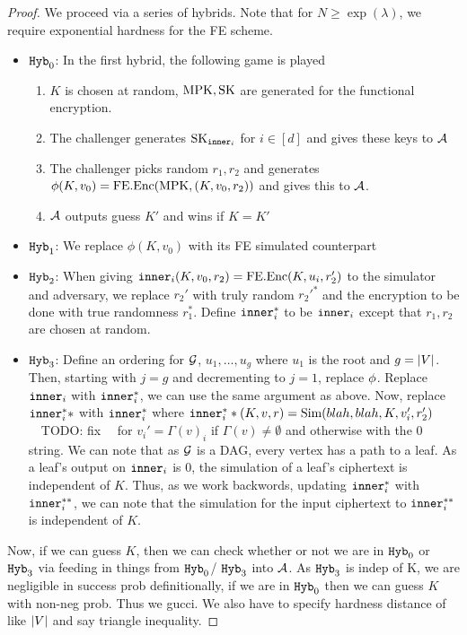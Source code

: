 \begin{lemma}
\begin{proof}
		We proceed via a series of hybrids. Note that for $N \geq \exp(\lambda)$, we require exponential hardness for the FE scheme.
		\begin{itemize}
			\item $\texttt{Hyb}_0$: In the first hybrid, the following game is played
				\begin{enumerate}
					\item $K$ is chosen at random, $\text{MPK}, \text{SK}$ are generated for the functional encryption.
					\item The challenger generates $\text{SK}_{\texttt{inner}_i}$ for $i \in [d]$ and gives these keys to $\mathcal{A}$
					\item The challenger picks random $r_1, r_2$ and generates $\phi(K, v_0) = \text{FE.Enc}(\text{MPK}, (K, v_0, r_2))$ and gives this to $\mathcal{A}$.
					\item $\mathcal{A}$ outputs guess $K'$ and wins if $K = K'$
				\end{enumerate}
			\item $\texttt{Hyb}_1$: We replace $\phi(K, v_0)$ with its FE simulated counterpart
			\item $\texttt{Hyb}_2$: When giving $\texttt{inner}_i(K, v_0, r_2) = \text{FE.Enc}(K, u_i, r_2')$ to the simulator and adversary,
			we replace $r_2'$ with truly random $r_2'^*$ and the encryption to be done with true randomness $r_1^*$.
			Define $\texttt{inner}_i^*$ to be $\texttt{inner}_i$ except that $r_1, r_2$ are chosen at random.
			\item $\texttt{Hyb}_3$: Define an ordering for $\mathcal{G}$, $u_1, \dots, u_g$ where $u_1$ is the root and $g = |V|$.
			Then, starting with $j = g$ and decrementing to $j = 1$, replace $\phi$.
			Replace $\texttt{inner}_i$ with $\texttt{inner}_i^*$, we can use the same argument as above.
			Now, replace $\texttt{inner}_i^**$ with $\texttt{inner}_i^*$ where $\texttt{inner}_i^**(K, v, r) = \text{Sim}(blah, blah, K, v_i', r_2')$ ~~TODO: fix~~ for $v_i' = \Gamma(v)_i$
			if $\Gamma(v) \neq \emptyset$ and otherwise with the $0$ string.
			We can note that as $\mathcal{G}$ is a DAG, every vertex has a path to a leaf.
			As a leaf's output on $\texttt{inner}_i$ is 0, the simulation of a leaf's ciphertext is independent of $K$.
			Thus, as we work backwords, updating $\texttt{inner}_i^*$ with $\texttt{inner}_i^{**}$, we can note that the simulation for the input ciphertext to $\texttt{inner}_i^{**}$ is independent of $K$.	
		\end{itemize}
		Now, if we can guess $K$, then we can check whether or not we are in $\texttt{Hyb}_0$ or $\texttt{Hyb}_3$ 
		via feeding in things from $\texttt{Hyb}_0$/ $\texttt{Hyb}_3$ into $\mathcal{A}$. As $\texttt{Hyb}_3$ is indep of K, we are negligible in success prob definitionally,
		if we are in $\texttt{Hyb}_0$ then we can guess $K$ with non-neg prob. Thus we gucci. We also have to specify hardness distance of like $|V|$ and say triangle inequality.
	\end{proof}
\end{lemma}

